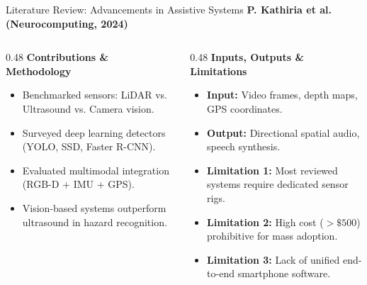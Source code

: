 \begin{frame}{Literature Review: Advancements in Assistive Systems}
{\large\textbf{\textcolor{MyUnivGreen}{P. Kathiria et al. (Neurocomputing, 2024) \cite{kathiria2024assistive}}}}\\[6pt]

\begin{columns}[T]
  \begin{column}{0.48\textwidth}
    \textbf{\textcolor{MyUnivGreen}{Contributions \& Methodology}}\\[4pt]
    \begin{itemize}
      \item Benchmarked sensors: LiDAR vs. Ultrasound vs. Camera vision.
      \item Surveyed deep learning detectors (YOLO, SSD, Faster R-CNN).
      \item Evaluated multimodal integration (RGB-D + IMU + GPS).
      \item Vision-based systems outperform ultrasound in hazard recognition.
    \end{itemize}
  \end{column}
  
  \begin{column}{0.48\textwidth}
    \textbf{\textcolor{MyUnivGreen}{Inputs, Outputs \& Limitations}}\\[4pt]
    \begin{itemize}
      \item \textbf{Input:} Video frames, depth maps, GPS coordinates.
      \item \textbf{Output:} Directional spatial audio, speech synthesis.
      \item \textbf{Limitation 1:} Most reviewed systems require dedicated sensor rigs.
      \item \textbf{Limitation 2:} High cost ($>\$500$) prohibitive for mass adoption.
      \item \textbf{Limitation 3:} Lack of unified end-to-end smartphone software.
    \end{itemize}
  \end{column}
\end{columns}
\end{frame}

